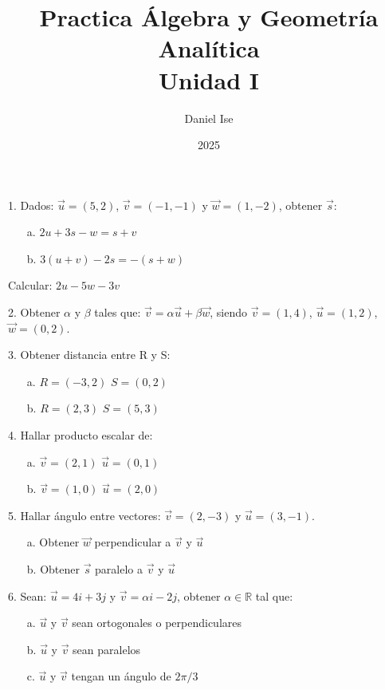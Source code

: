 \documentclass[aspectratio=1610,t, 10pt]{beamer}
\title{Practica Álgebra y Geometría Analítica\\Unidad I}
\author{Daniel Ise}
\institute{Universidad de la Marina Mercante}
\date{2025}
\begin{document}
\frame{\titlepage}

\begin{frame}
1. Dados: \(\vec{u} = (5,2)\), \(\vec{v} = (-1, -1)\) y \(\vec{w} = (1, -2)\),
obtener \(\vec{s}\):
\begin{itemize}
    \item[a.]\(2u + 3s - w = s + v\)
    \item[b.]\(3(u+v) - 2s = -(s+w)\)
\end{itemize} 
Calcular: \(2u - 5w - 3v\)
\end{frame}

\begin{frame}
2. Obtener \(\alpha\) y \(\beta\) tales que: 
\(\vec{v} = \alpha\vec{u} + \beta\vec{w}\),
siendo \(\vec{v} = (1,4)\), \(\vec{u} = (1,2)\), \(\vec{w} = (0,2)\).
\end{frame}

\begin{frame} 
3. Obtener distancia entre R y S:
\begin{itemize}
    \item[a.] \(R=(-3,2)\) \(S=(0,2)\)
    \item[b.] \(R=(2,3)\) \(S=(5,3)\)
\end{itemize}
\end{frame}

\begin{frame} 
4. Hallar producto escalar de:
\begin{itemize}
    \item[a.] \(\vec{v}=(2,1)\) \(\vec{u}=(0,1)\)
    \item[b.] \(\vec{v}=(1,0)\) \(\vec{u}=(2,0)\)
\end{itemize}
\end{frame}

\begin{frame} 
5. Hallar ángulo entre vectores:  \(\vec{v}=(2,-3)\) y \(\vec{u}=(3,-1)\).
\begin{itemize}
    \item[a.] Obtener \(\vec{w}\) perpendicular a \(\vec{v}\) y \(\vec{u}\)
    \item[b.] Obtener \(\vec{s}\) paralelo a \(\vec{v}\) y \(\vec{u}\)
\end{itemize}
\end{frame}

\begin{frame} 
6. Sean:  \(\vec{u}= 4i + 3j\) y \(\vec{v}= \alpha i - 2j\),
obtener \(\alpha\in\mathbb{R}\) tal que:
\begin{itemize}
    \item[a.] \(\vec{u}\) y \(\vec{v}\) sean ortogonales o perpendiculares
    \item[b.] \(\vec{u}\) y \(\vec{v}\) sean paralelos
    \item[c.] \(\vec{u}\) y \(\vec{v}\) tengan un ángulo de \(2\pi/3\)
\end{itemize}
\end{frame}
\end{document}
